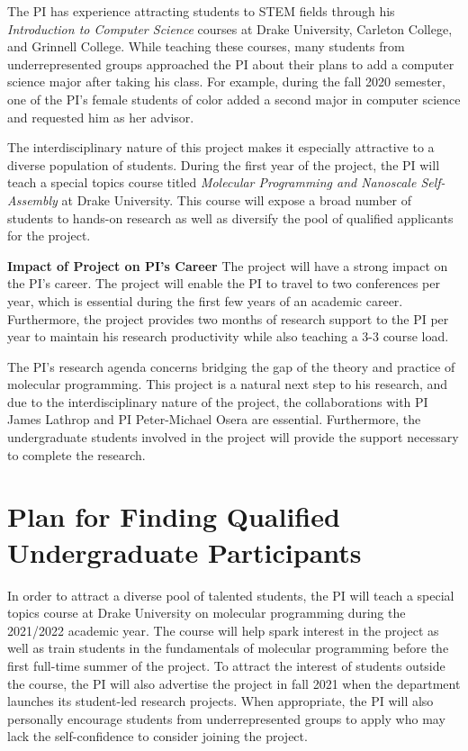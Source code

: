 \documentclass[11pt]{article}
\begin{document}
    The PI has experience attracting students to STEM fields through his \emph{Introduction to Computer Science} courses at Drake University, Carleton College, and Grinnell College.
    While teaching these courses, many students from underrepresented groups approached the PI about their plans to add a computer science major after taking his class.
    For example, during the fall 2020 semester, one of the PI's female students of color added a second major in computer science and requested him as her advisor.

    The interdisciplinary nature of this project makes it especially attractive to a diverse population of students.
    During the first year of the project, the PI will teach a special topics course titled \emph{Molecular Programming and Nanoscale Self-Assembly} at Drake University.
    This course will expose a broad number of students to hands-on research as well as diversify the pool of qualified applicants for the project.


    \textbf{Impact of Project on PI's Career}
    The project will have a strong impact on the PI's career.
    The project will enable the PI to travel to two conferences per year, which is essential during the first few years of an academic career.
    Furthermore, the project provides two months of research support to the PI per year to maintain his research productivity while also teaching a 3-3 course load.

    The PI's research agenda concerns bridging the gap of the theory and practice of molecular programming.
    This project is a natural next step to his research, and due to the interdisciplinary nature of the project, the collaborations with PI James Lathrop and PI Peter-Michael Osera are essential.
    Furthermore, the undergraduate students involved in the project will provide the support necessary to complete the research.

    \section{Plan for Finding Qualified Undergraduate Participants}
    In order to attract a diverse pool of talented students, the PI will teach a special topics course at Drake University on molecular programming during the 2021/2022 academic year.
    The course will help spark interest in the project as well as train students in the fundamentals of molecular programming before the first full-time summer of the project.
    To attract the interest of students outside the course, the PI will also advertise the project in fall 2021 when the department launches its student-led research projects.
    When appropriate, the PI will also personally encourage students from underrepresented groups to apply who may lack the self-confidence to consider joining the project.
\end{document}
